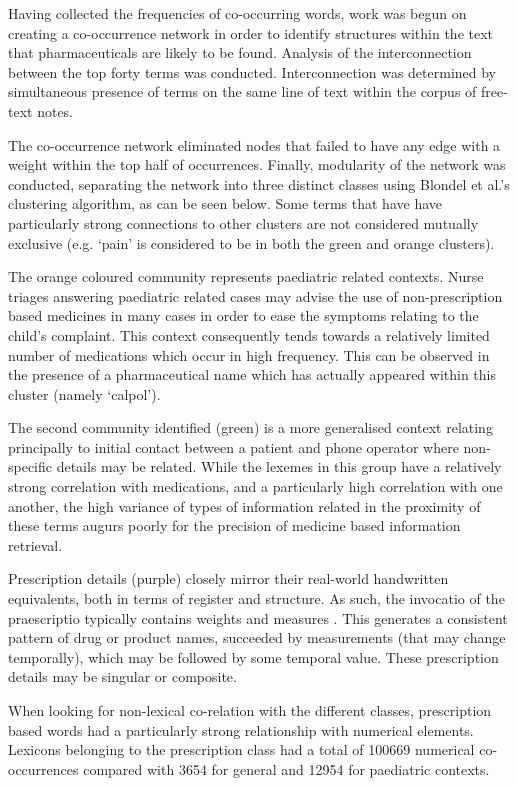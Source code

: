 Having collected the frequencies of co-occurring words, work was begun on creating a co-occurrence network in order to identify structures within the text that pharmaceuticals are likely to be found. Analysis of the interconnection between the top forty terms was conducted. Interconnection was determined by simultaneous presence of terms on the same line of text within the corpus of free-text notes. 

The co-occurrence network eliminated nodes that failed to have any edge with a weight within the top half of occurrences. Finally, modularity of the network was conducted, separating the network into three distinct classes using Blondel et al.'s clustering algorithm,\cite{blondel2008fast} as can be seen below. Some terms that have have particularly strong connections to other clusters are not considered mutually exclusive (e.g. `pain' is considered to be in both the green and orange clusters).

The orange coloured community represents paediatric related contexts. Nurse triages answering paediatric related cases may advise the use of non-prescription based medicines in many cases in order to ease the symptoms relating to the child's complaint. This context consequently tends towards a relatively limited number of medications which occur in high frequency. This can be observed in the presence of a pharmaceutical name which has actually appeared within this cluster (namely `calpol').

The second community identified (green) is a more generalised context relating principally to initial contact between a patient and phone operator where non-specific details may be related. While the lexemes in this group have a relatively strong correlation with medications, and a particularly high correlation with one another, the high variance of types of information related in the proximity of these terms augurs poorly for the precision of medicine based information retrieval. 

Prescription details (purple) closely mirror their real-world handwritten equivalents, both in terms of register and structure. As such, the invocatio of the praescriptio typically contains weights and measures \cite{hadavsova2009practicals}. This generates a consistent pattern of drug or product names, succeeded by measurements (that may change temporally), which may be followed by some temporal value. These prescription details may be singular or composite.

When looking for non-lexical co-relation with the different classes, prescription based words had a particularly strong relationship with numerical elements. Lexicons belonging to the prescription class had a total of 100669 numerical co-occurrences compared with 3654 for general and 12954 for paediatric contexts. 

